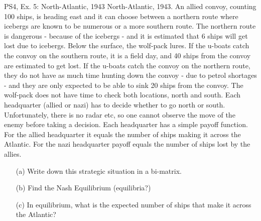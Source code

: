 \begin{frame}{PS4, Ex. 5: North-Atlantic, 1943}
  North-Atlantic, 1943. An allied convoy, counting 100 ships, is heading east and it can choose between a northern route where icebergs are known to be numerous or a more southern route. The northern route is dangerous - because of the icebergs - and it is estimated that 6 ships will get lost due to icebergs. Below the surface, the wolf-pack lures. If the u-boats catch the convoy on the southern route, it is a field day, and 40 ships from the convoy are estimated to get lost. If the u-boats catch the convoy on the northern route, they do not have as much time hunting down the convoy - due to petrol shortages - and they are only expected to be able to sink 20 ships from the convoy. The wolf-pack does not have time to check both locations, north and south. Each headquarter (allied or nazi) has to decide whether to go north or south. Unfortunately, there is no radar etc, so one cannot observe the move of the enemy before taking a decision. Each headquarter has a simple payoff function. For the allied headquarter it equals the number of ships making it across the Atlantic. For the nazi headquarter payoff equals the number of ships lost by the allies.
  \begin{itemize}
    \item[(a)] Write down this strategic situation in a bi-matrix.
    \item[(b)] Find the Nash Equilibrium (equilibria?)
    \item[(c)] In equilibrium, what is the expected number of ships that make it across the Atlantic?
  \end{itemize}
\end{frame}
